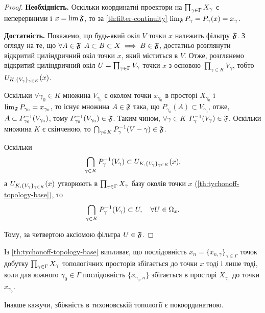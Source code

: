 \begin{proof}
    \textbf{Необхідність.} Оскільки координатні проектори на $\CartesianProduct{X}$ є неперервними і $x = \lim \frak F$, то за \cref{th:filter-continuity} $\lim_{\frak F} P_\gamma = P_\gamma(x) = x_\gamma$.

    \textbf{Достатність.} Покажемо, що будь-який окіл $V$ точки $x$ належить фільтру $\frak F$. З огляду на те, що $\forall A \in \frak F$ $A \subset B \subset X \implies B \in \frak F$, достатньо розглянути відкритий циліндричний окіл точки $x$, який міститься в $V$. Отже, розглянемо відкритий циліндричний окіл $U = \CartesianProduct{V}$ точки $x$ з основою $\prod_{\gamma \in K} V_\gamma$, тобто $\CartesianNeighbourhood{x}$.
    
    Оскільки $\forall \gamma_0 \in K$ множина $V_{\gamma_0}$ є околом точки $x_{\gamma_0}$ в просторі $X_{\gamma_0}$ і $\lim_{\frak F} P_{\gamma_0} = x_{\gamma_0}$, то існує множина $A \in \frak F$ така, що $P_{\gamma_0}(A) \subset V_{\gamma_0}$, отже, $A \subset P_{\gamma_0}\inv (V_{\gamma_0})$, тому $P_{\gamma_0}\inv (V_{\gamma_0}) \in \frak F$. Таким чином, $\forall \gamma \in K$ $P_\gamma\inv (V_\gamma) \in \frak F$. Оскільки множина $K$ є скінченою, то $\bigcap_{\gamma \in K} P_\gamma\inv (V-\gamma) \in \frak F$.
    
    Оскільки
    \begin{equation*}
        \bigcap_{\gamma \in K} P_\gamma\inv (V_\gamma) \subset \CartesianNeighbourhood{x},
    \end{equation*}
    а $\CartesianNeighbourhood{x}$ утворюють в $\CartesianProduct{X}$ базу околів точки $x$ (\cref{th:tychonoff-topology-base}), то
    \begin{equation*}
        \bigcap_{\gamma \in K} P_\gamma\inv (V_\gamma) \subset U, \quad \forall U \in \Omega_x.
    \end{equation*}

    Тому, за четвертою аксіомою фільтра $U \in \frak F$.
\end{proof}

\begin{remark}
    Із \cref{th:tychonoff-topology-base} випливає, що послідовність $x_n = \{x_{n,\gamma}\}_{\gamma \in \Gamma}$ точок добутку $\CartesianProduct{X}$ топологічних просторів збігається до точки $x$ тоді і лише тоді, коли для кожного $\gamma_0 \in \Gamma$ послідовність $\{x_{\gamma_0, n}\}$ збігається в просторі $X_{\gamma_0}$ до точки $x_{\gamma_0}$. 
    
    Інакше кажучи, збіжність в тихоновській топології є покоординатною.
\end{remark}

